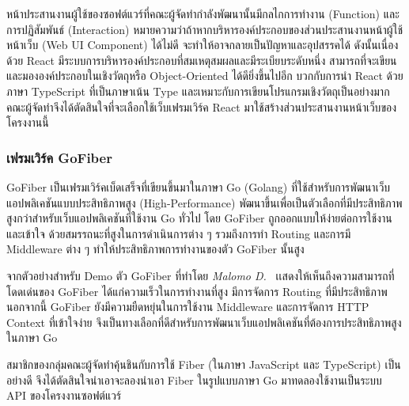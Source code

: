 \documentclass[12pt,one side,openright,a4paper]{cpe-thesis-th}
\newcommand{\thaijustify}[1]{%
  \par\hspace{30pt}\justifying
  #1
}
\begin{document}
\thaijustify{
  หน้าประสานงานผู้ใช้ของซอฟต์แวร์ที่คณะผู้จัดทำกำลังพัฒนานั้นมีกลไกการทำงาน (Function) และการปฏิสัมพันธ์ (Interaction) หมายความว่าถ้าหากบริหารองค์ประกอบของส่วนประสานงานหน้าผู้ใช้หน้าเว็บ (Web UI Component) ได้ไม่ดี จะทำให้อาจกลายเป็นปัญหาและอุปสรรคได้ ดังนั้นเนื่องด้วย React มีระบบการบริหารองค์ประกอบที่สมเหตุสมผลและมีระเบียบระดับหนึ่ง สามารถที่จะเขียนและมององค์ประกอบในเชิงวัตถุหรือ Object-Oriented ได้ดียิ่งขึ้นไปอีก บวกกับการนำ React ด้วยภาษา TypeScript ที่เป็นภาษาเน้น Type และเหมาะกับการเขียนโปรแกรมเชิงวัตถุเป็นอย่างมาก คณะผู้จัดทำจึงได้ตัดสินใจที่จะเลือกใช้เว็บเฟรมเวิร์ค React มาใช้สร้างส่วนประสานงานหน้าเว็บของโครงงานนี้
}
\subsubsection{เฟรมเวิร์ค GoFiber}
\thaijustify{
  GoFiber เป็นเฟรมเวิร์คเบ็ดเสร็จที่เขียนขึ้นมาในภาษา Go (Golang) ที่ใช้สำหรับการพัฒนาเว็บแอปพลิเคชันแบบประสิทธิภาพสูง (High-Performance) พัฒนาขึ้นเพื่อเป็นตัวเลือกที่มีประสิทธิภาพสูงกว่าสำหรับเว็บแอปพลิเคชันที่ใช้งาน Go ทั่วไป โดย GoFiber ถูกออกแบบให้ง่ายต่อการใช้งานและเข้าใจ ด้วยสมรรถนะที่สูงในการดำเนินการต่าง ๆ รวมถึงการทำ Routing และการมี Middleware ต่าง ๆ ทำให้ประสิทธิภาพการทำงานของตัว GoFiber นั้นสูง~\cite{gofiber}
}
\thaijustify{
  จากตัวอย่างสำหรับ Demo ตัว GoFiber ที่ทำโดย \textit{Malomo D.}~\cite{malomo20fiber} เเสดงให้เห็นถึงความสามารถที่โดดเด่นของ GoFiber ได้แก่ความเร็วในการทำงานที่สูง มีการจัดการ Routing ที่มีประสิทธิภาพ นอกจากนี้ GoFiber ยังมีความยืดหยุ่นในการใช้งาน Middleware และการจัดการ HTTP Context ที่เข้าใจง่าย จึงเป็นทางเลือกที่ดีสำหรับการพัฒนาเว็บแอปพลิเคชันที่ต้องการประสิทธิภาพสูงในภาษา Go
}
\thaijustify{
  สมาชิกของกลุ่มคณะผู้จัดทำคุ้นชินกับการใช้ Fiber (ในภาษา JavaScript และ TypeScript) เป็นอย่างดี จึงได้ตัดสินใจนำเอาจะลองนำเอา Fiber ในรูปแบบภาษา Go มาทดลองใช้งานเป็นระบบ API ของโครงงานซอฟต์แวร์
}
\end{document}
